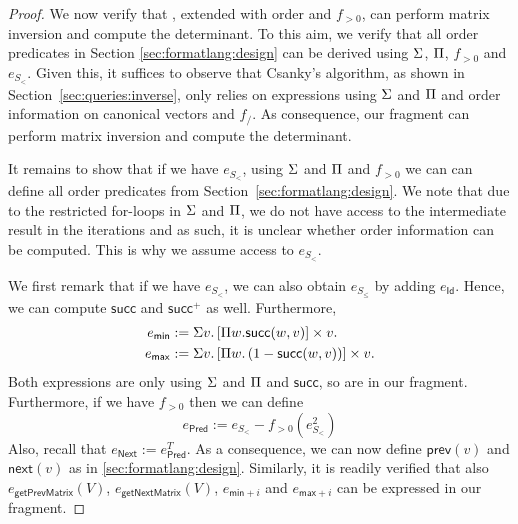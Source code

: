 
\begin{proof}
We now verify that \langmprod, extended with order and $f_{>0}$, 
can perform matrix inversion and compute the determinant. 
To this aim, we verify that all order
predicates in Section \ref{sec:formatlang:design} can be derived using $\Sigma$, $\Pi$, $f_{>0}$ and 
$e_{S_{<}}$. Given this, it suffices to observe that Csanky's algorithm, as shown in Section~\ref{sec:queries:inverse}, only relies on expressions using $\Sigma$ and $\Pi$ and order information on canonical vectors and $f_/$.
As consequence, our fragment can perform matrix inversion and compute the determinant.


It remains to show that if we have $e_{S_{<}}$, using $\Sigma$ and $\Pi$ and $f_{>0}$ we can
can define all order predicates from Section~\ref{sec:formatlang:design}. We note that due to the restricted for-loops
in $\Sigma$ and $\Pi$, we do not have access to the intermediate
result in the iterations and as such, it is unclear whether order information can be computed. This is why
we assume access to $e_{S_<}$.

We first remark that if we have $e_{S_{<}}$, we can also obtain
 $e_{S_{\leq}}$ by adding $e_{\mathsf{Id}}$. Hence,
we can compute $\mathsf{succ}$ and $\mathsf{succ}^+$ as well. Furthermore, 
\begin{align*}
  e_{\mathsf{min}}&:=\Sigma v. \left[ \Pi w. \mathsf{succ}(w,v)\right] \times v. \\
  e_{\mathsf{max}}&:=\Sigma v. \left[ \Pi w. \left( 1-\mathsf{succ}(w,v) \right) \right] \times v.
\end{align*}
Both expressions are only using $\Sigma$ and $\Pi$ and $\mathsf{succ}$, so are in our fragment.
Furthermore, if we have $f_{>0}$ then we can define
$$
e_{\mathsf{Pred}}:= e_{S_{<}}- f_{>0}(e_{S_{<}}^2)
$$
Also, recall that  $e_{\mathsf{Next}}:=e_{\mathsf{Pred}}^T$. As a consequence, 
we can now define $\mathsf{prev}(v)$ and $\mathsf{next}(v)$ as in \ref{sec:formatlang:design}. Similarly,
it is readily verified that also $e_{\mathsf{getPrevMatrix}}(V)$,
$e_{\mathsf{getNextMatrix}}(V)$, $e_{\mathsf{min}+i}$ and $e_{\mathsf{max}+i}$ can be expressed
in our fragment.
\end{proof}
